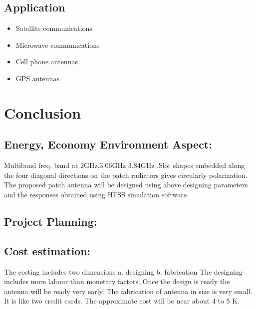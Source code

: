 \documentclass[12pt]{article}
\begin{document}
						                 
						                 \subsection{Application}
						                 \begin{itemize}
						                 	\item Satellite communications
						                 	\item Microwave communications
						                 	\item Cell phone antennas
						                 	\item GPS antennas
						                 	
						                 \end{itemize}
						    
						              
					               	
				

\cleardoublepage

\section{Conclusion}\label{sec:Conclusion}
    \subsection{Energy, Economy Environment Aspect:}\label{sub:Energy, Economy Environment Aspect:}
       Multiband freq. band at 2GHz,3.06GHz  3.84GHz  .Slot shapes embedded along the four diagonal directions on the patch radiators gives circularly polarization. The proposed patch antenna will be designed using above designing parameters and the responses obtained using HFSS simulation software.
    \subsection{Project Planning:}\label{sub:Project Planning:}

    \subsection{Cost estimation:}\label{sub:Cost estimation:}
      The costing includes two dimensions
      a.  designing
      b. fabrication
      The designing includes more labour than monetary factors. Once the design is ready the antenna will be ready very early.  The fabrication of antenna in size is very small.  It is like two credit cards.
      The approximate cost will be near about 4 to 5 K.
\cleardoublepage
\end{document}
